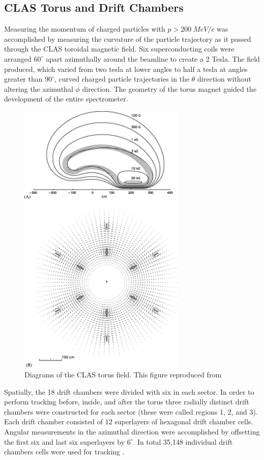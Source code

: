 \subsection{CLAS Torus and Drift Chambers}
Measuring the momentum of charged particles with $p > 200 \; MeV/c$ was accomplished by measuring the curvature of the particle trajectory as it passed through the CLAS toroidal magnetic field.  Six superconducting coils were arranged $60^\circ$ apart azimuthally around the beamline to create a 2 Tesla.  The field produced, which varied from two tesla at lower angles to half a tesla at angles greater than $90^\circ$, curved charged particle trajectories in the $\theta$ direction without altering the azimuthal $\phi$ direction.  The geometry of the torus magnet guided the development of the entire spectrometer.  \\

\begin{figure}
	\centering
		\includegraphics[width=8cm]{image/diagrams/torus-field.png}
		\caption{Diagrams of the CLAS torus field.  This figure reproduced from \cite{hardware-adams:2001}}
\end{figure}

Spatially, the 18 drift chambers were divided with six in each sector.  In order to perform tracking before, inside, and after the torus three radially distinct drift chambers were constructed for each sector (these were called regions 1, 2, and 3).  Each drift chamber consisted of 12 superlayers of hexagonal drift chamber cells.  Angular measurements in the azimuthal direction were accomplished by offsetting the first six and last six superlayers by $6^\circ$.  In total 35,148 individual drift chambers cells were used for tracking \cite{hardware-mestayer:2000}.

